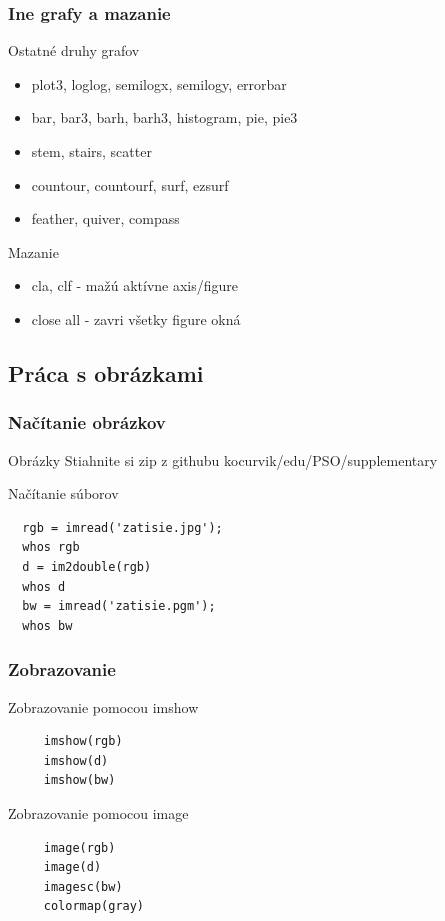\documentclass{beamer}
\begin{document}
\begin{frame}
\frametitle{Ine grafy a mazanie}
  
   \begin{block}{Ostatné druhy grafov}
   \begin{itemize}
    \item plot3, loglog, semilogx, semilogy, errorbar
    \item bar, bar3, barh, barh3, histogram, pie, pie3
    \item stem, stairs, scatter
    \item countour, countourf, surf, ezsurf
    \item feather, quiver, compass
   \end{itemize}
  \end{block}
  
  \pause 
  
   \begin{block}{Mazanie}
   \begin{itemize}
    \item cla, clf - mažú aktívne axis/figure
    \item close all - zavri všetky figure okná
   \end{itemize}
  \end{block}
\end{frame}

\subsection{Práca s obrázkami}

\begin{frame}[fragile]
\frametitle{Načítanie obrázkov}
  
  \begin{block}{Obrázky}
    Stiahnite si zip z githubu kocurvik/edu/PSO/supplementary
  \end{block}
  
  \pause 
  
  \begin{block}{Načítanie súborov}
  \begin{verbatim}
  rgb = imread('zatisie.jpg');
  whos rgb
  d = im2double(rgb)
  whos d
  bw = imread('zatisie.pgm');
  whos bw \end{verbatim}  
  \end{block}
\end{frame}

\begin{frame}[fragile]
\frametitle{Zobrazovanie} 
  \begin{block}{Zobrazovanie pomocou imshow}
  \begin{verbatim}
     imshow(rgb)
     imshow(d)
     imshow(bw)   \end{verbatim}  
  \end{block}
  
  \pause
  
  \begin{block}{Zobrazovanie pomocou image}
  \begin{verbatim}
     image(rgb)
     image(d)
     imagesc(bw)
     colormap(gray)   \end{verbatim}  
  \end{block}
\end{frame}
\end{document}
